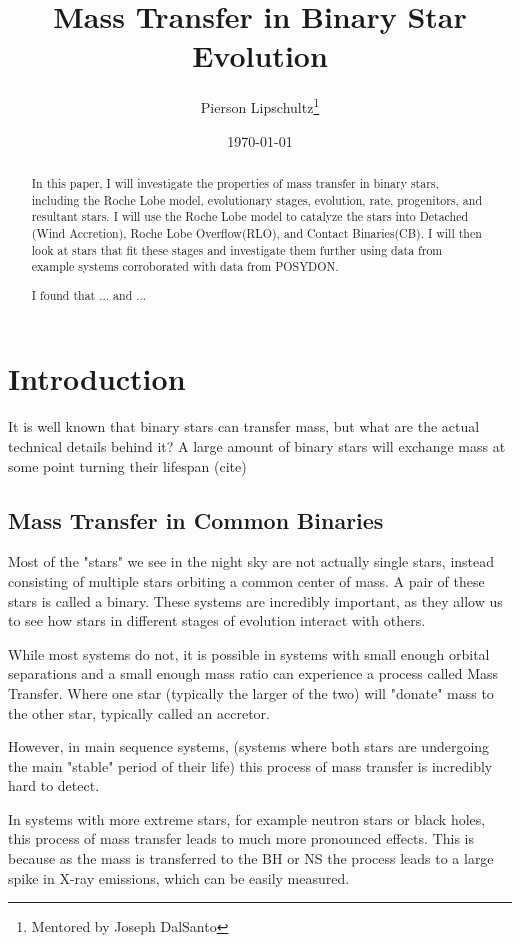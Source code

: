 \documentclass[12pt, letterpaper]{article}
\title{Mass Transfer in Binary Star Evolution}
\author{Pierson Lipschultz\thanks{Mentored by Joseph DalSanto}}
\date{\today}
\begin{document}
\maketitle
\begin{abstract}
    \normalsize
    In this paper, I will investigate the properties of mass transfer in binary stars, including the Roche Lobe model, evolutionary stages, evolution, rate, progenitors, and resultant stars. I will use the Roche Lobe model to catalyze the stars into Detached (Wind Accretion), Roche Lobe Overflow(RLO), and Contact Binaries(CB). I will then look at stars that fit these stages and investigate them further using data from example systems corroborated with data from POSYDON.

    I found that ... and ...
\end{abstract}

\pagebreak

\section{\centering Introduction} %
    It is well known that binary stars can transfer mass, but what are the actual technical details behind it? A large amount of binary stars will exchange mass at some point turning their lifespan (cite)

    \subsection{Mass Transfer in Common Binaries}
    
    Most of the "stars" we see in the night sky are not actually single stars, instead consisting of multiple stars orbiting a common center of mass. A pair of these stars is called a binary. These systems are incredibly important, as they allow us to see how stars in different stages of evolution interact with others. 

    While most systems do not, it is possible in systems with small enough orbital separations and a small enough mass ratio can experience a process called Mass Transfer. Where one star (typically the larger of the two) will "donate" mass to the other star, typically called an accretor. 

    However, in main sequence systems, (systems where both stars are undergoing the main "stable" period of their life) this process of mass transfer is incredibly hard to detect.

    In systems with more extreme stars, for example neutron stars or black holes, this process of mass transfer leads to much more pronounced effects. This is because as the mass is transferred to the BH or NS the process leads to a large spike in X-ray emissions, which can be easily measured.
\end{document}
